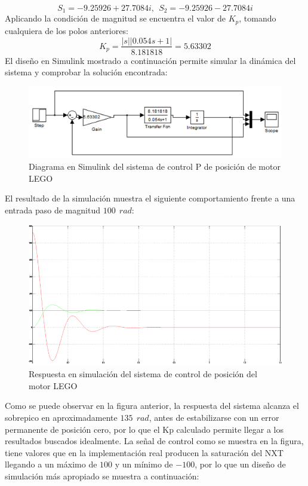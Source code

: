 \documentclass[twocolumn]{IEEEtran}
\begin{document}
\begin{equation}
 S_1  =  - 9.25926 + 27.7084i,\ \ S_2  =  - 9.25926 - 27.7084i
\label{ecu14}
\end{equation}
\noindent
Aplicando la condición de magnitud se encuentra el valor de $K_p$, tomando cualquiera de los polos anteriores:
\begin{equation}
 K_p  = \frac{{\left| s \right|\left| {0.054s + 1} \right|}}{{8.181818}} = 5.63302
\label{ecu15}
\end{equation}
\noindent
El diseño en Simulink mostrado a continuación permite simular la dinámica del sistema y comprobar la solución encontrada:
\begin{figure}[H]
	\centering
		\includegraphics[scale=0.33]{diagram2.png}
	\caption{Diagrama en Simulink del sistema de control P de posición de motor LEGO}
	\label{fig7}
\end{figure}
\noindent
El resultado de la simulación muestra el siguiente comportamiento frente a una entrada paso de magnitud $100\ \ rad$:
\begin{figure}[H]
	\centering
		\includegraphics[scale=0.31]{salida3.png}
	\caption{Respuesta en simulación del sistema de control de posición del motor LEGO}
	\label{fig8}
\end{figure}
\noindent
Como se puede observar en la figura anterior, la respuesta del sistema alcanza el sobrepico en aproximadamente $135\ \ rad$, antes de estabilizarse con un error permanente de posición cero, por lo que el Kp calculado permite llegar a los resultados buscados idealmente. La señal de control como se muestra en la figura, tiene valores que en la implementación real producen la saturación del NXT llegando a un máximo de $100$ y un mínimo de $-100$, por lo que un diseño de simulación más apropiado se muestra a continuación:
\end{document}
